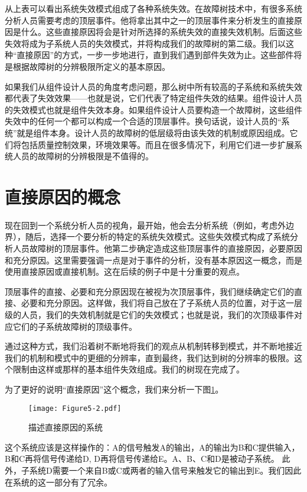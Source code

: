 \documentclass[cn,11pt,chinese]{elegantbook}
\begin{document}
从上表可以看出系统失效模式组成了各种系统失效。在故障树技术中，有很多系统分析人员需要考虑的顶层事件。他将拿出其中之一的顶层事件来分析发生的直接原因是什么。这些直接原因将会是针对所选择的系统失效的直接失效机制。后面这些失效将成为子系统人员的失效模式，并将构成我们的故障树的第二级。我们以这种“直接原因”的方式，一步一步地进行，直到我们遇到部件失效为止。这些部件将是根据故障树的分辨极限所定义的基本原因。

如果我们从组件设计人员的角度考虑问题，那么树中所有较高的子系统和系统失效都代表了失效效果——也就是说，它们代表了特定组件失效的结果。组件设计人员的失效模式也就是组件失效本身。如果组件设计人员要构造一个故障树，这些组件失效中的任何一个都可以构成一个合适的顶层事件。换句话说，设计人员的“系统”就是组件本身。设计人员的故障树的低层级将由该失效的机制或原因组成。它们将包括质量控制效果，环境效果等。而且在很多情况下，利用它们进一步扩展系统人员的故障树的分辨极限是不值得的。


\section{直接原因的概念}

现在回到一个系统分析人员的视角，最开始，他会去分析系统（例如，考虑外边界），随后，选择一个要分析的特定的系统失效模式。这些失效模式构成了系统分析人员故障树的顶层事件。他第二步确定造成这些顶层事件的直接原因，必要原因和充分原因。这里需要强调一点是对于事件的分析，没有基本原因这一概念，而是使用直接原因或直接机制。这在后续的例子中是十分重要的观点。

顶层事件的直接、必要和充分原因现在被视为次顶层事件，我们继续确定它们的直接、必要和充分原因。这样做，我们将自己放在了子系统人员的位置，对于这一层级的人员，我们的失效机制就是它们的失效模式；也就是说，我们的次顶级事件对应它们的子系统故障树的顶级事件。

通过这种方式，我们沿着树不断地将我们的观点从机制转移到模式，并不断地接近我们的机制和模式中的更细的分辨率，直到最终，我们达到树的分辨率的极限。这个限制由这样或那样的基本组件失效组成。我们的树现在完成了。

为了更好的说明“直接原因”这个概念，我们来分析一下图\ref{fig:fig5-2}。

\begin{figure}[h]
	\centering
	\texttt{[image: Figure5-2.pdf]}
	\caption{描述直接原因的系统}\label{fig:fig5-2}
\end{figure}

这个系统应该是这样操作的：A的信号触发A的输出，A的输出为B和C提供输入，B和C再将信号传递给D, D再将信号传递给E。A、B、C和D是被动子系统。
此外，子系统D需要一个来自B或C或两者的输入信号来触发它的输出到E。我们因此在系统的这一部分有了冗余。
\end{document}
